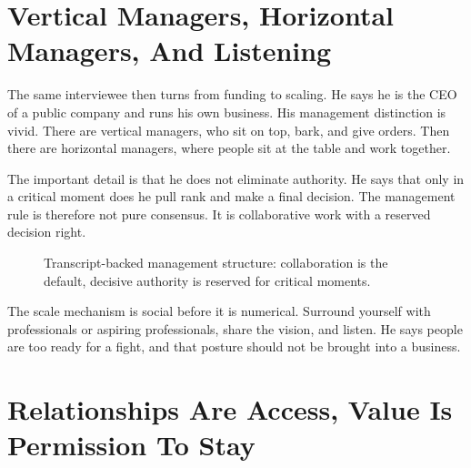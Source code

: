 \section{Vertical Managers, Horizontal Managers, And Listening}

The same interviewee then turns from funding to scaling. He says he is the CEO of a public company and runs his own business. His management distinction is vivid. There are vertical managers, who sit on top, bark, and give orders. Then there are horizontal managers, where people sit at the table and work together.

The important detail is that he does not eliminate authority. He says that only in a critical moment does he pull rank and make a final decision. The management rule is therefore not pure consensus. It is collaborative work with a reserved decision right.

\begin{figure}
\centering
{}
\caption{Transcript-backed management structure: collaboration is the default, decisive authority is reserved for critical moments.}
\end{figure}

The scale mechanism is social before it is numerical. Surround yourself with professionals or aspiring professionals, share the vision, and listen. He says people are too ready for a fight, and that posture should not be brought into a business.

\section{Relationships Are Access, Value Is Permission To Stay}

